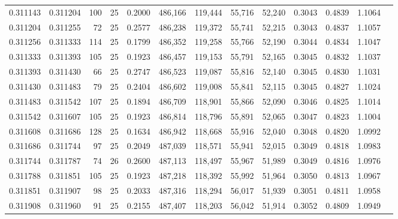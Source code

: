 \begin{tabular}{rrrrrrrrrrrrr}
0.311143 & 0.311204 &   100 &  25 &                                     0.2000 & 486,166 & 119,444 &  55,716 &  52,240 & 0.3043 & 0.4839 & 1.1064 \\
0.311204 & 0.311255 &    72 &  25 &                                     0.2577 & 486,238 & 119,372 &  55,741 &  52,215 & 0.3043 & 0.4837 & 1.1057 \\
0.311256 & 0.311333 &   114 &  25 &                                     0.1799 & 486,352 & 119,258 &  55,766 &  52,190 & 0.3044 & 0.4834 & 1.1047 \\
0.311333 & 0.311393 &   105 &  25 &                                     0.1923 & 486,457 & 119,153 &  55,791 &  52,165 & 0.3045 & 0.4832 & 1.1037 \\
0.311393 & 0.311430 &    66 &  25 &                                     0.2747 & 486,523 & 119,087 &  55,816 &  52,140 & 0.3045 & 0.4830 & 1.1031 \\
0.311430 & 0.311483 &    79 &  25 &                                     0.2404 & 486,602 & 119,008 &  55,841 &  52,115 & 0.3045 & 0.4827 & 1.1024 \\
0.311483 & 0.311542 &   107 &  25 &                                     0.1894 & 486,709 & 118,901 &  55,866 &  52,090 & 0.3046 & 0.4825 & 1.1014 \\
0.311542 & 0.311607 &   105 &  25 &                                     0.1923 & 486,814 & 118,796 &  55,891 &  52,065 & 0.3047 & 0.4823 & 1.1004 \\
0.311608 & 0.311686 &   128 &  25 &                                     0.1634 & 486,942 & 118,668 &  55,916 &  52,040 & 0.3048 & 0.4820 & 1.0992 \\
0.311686 & 0.311744 &    97 &  25 &                                     0.2049 & 487,039 & 118,571 &  55,941 &  52,015 & 0.3049 & 0.4818 & 1.0983 \\
0.311744 & 0.311787 &    74 &  26 &                                     0.2600 & 487,113 & 118,497 &  55,967 &  51,989 & 0.3049 & 0.4816 & 1.0976 \\
0.311788 & 0.311851 &   105 &  25 &                                     0.1923 & 487,218 & 118,392 &  55,992 &  51,964 & 0.3050 & 0.4813 & 1.0967 \\
0.311851 & 0.311907 &    98 &  25 &                                     0.2033 & 487,316 & 118,294 &  56,017 &  51,939 & 0.3051 & 0.4811 & 1.0958 \\
0.311908 & 0.311960 &    91 &  25 &                                     0.2155 & 487,407 & 118,203 &  56,042 &  51,914 & 0.3052 & 0.4809 & 1.0949 \\

\end{tabular}
